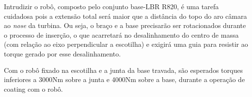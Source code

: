 Intrudizir o robô, composto pelo conjunto base-LBR R820, é uma tarefa cuidadosa
pois a extensão total será maior que a distância do topo do aro câmara ao
\emph{nose} da turbina. Ou seja, o braço e a base precisarão ser rotacionados
durante o processo de inserção, o que acarretará no desalinhamento do centro de
massa (com relação ao eixo perpendicular a escotilha) e exigirá uma guia para
resistir ao torque gerado por esse desalinhamento.

Com o robô fixado na escotilha e a junta da base travada, são esperados torques
inferiores a 3000Nm sobre a junta e 4000Nm sobre a base, durante a operação de
coating com o robô.